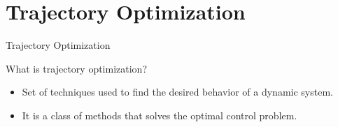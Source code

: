 \documentclass{thesisbeamer}
\begin{document}
\section{Trajectory Optimization}


\begin{frame}{Trajectory Optimization}

What is trajectory optimization?
\begin{itemize}[<+->]
	\item Set of techniques used to find the desired behavior of a dynamic system.
	\item It is a class of methods that solves the optimal control problem.
\end{itemize}
\end{frame}
\end{document}
